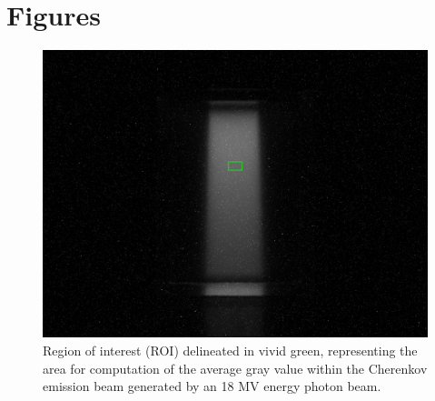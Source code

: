 \documentclass[12pt,french]{article}
\begin{document}
\pagestyle{plain}
\resumeanglais
\section*{Figures}
\begin{figure}[!htb]
    \centering
    \includegraphics[width=1\linewidth]{image_with_rectangle.png}
    \captionsetup{width=1\linewidth}
    \caption{Region of interest (ROI) delineated in vivid green, representing the area for computation of the average gray value within the Cherenkov emission beam generated by an 18 MV energy photon beam.}
    \label{fig:ROI}
\end{figure}
\printbibliography
\end{document}
